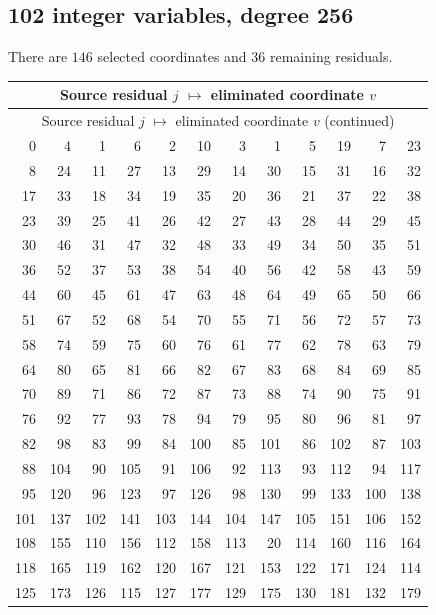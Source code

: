 \documentclass[11pt,letterpaper]{article}
\theoremstyle{definition}
\theoremstyle{remark}
\begin{document}
\subsection{102 integer variables, degree 256}
There are $146$ selected coordinates and $36$ remaining residuals.
\begingroup
\small
\setlength{\tabcolsep}{4pt}
\begin{longtable}{*{6}{r@{\,$\mapsto$\,}r}}
\hline
\multicolumn{12}{c}{Source residual $j$ $\mapsto$ eliminated coordinate $v$}\\
\hline
\endfirsthead
\hline
\multicolumn{12}{c}{Source residual $j$ $\mapsto$ eliminated coordinate $v$ (continued)}\\
\hline
\endhead
0 & 4 & 1 & 6 & 2 & 10 & 3 & 1 & 5 & 19 & 7 & 23 \\
8 & 24 & 11 & 27 & 13 & 29 & 14 & 30 & 15 & 31 & 16 & 32 \\
17 & 33 & 18 & 34 & 19 & 35 & 20 & 36 & 21 & 37 & 22 & 38 \\
23 & 39 & 25 & 41 & 26 & 42 & 27 & 43 & 28 & 44 & 29 & 45 \\
30 & 46 & 31 & 47 & 32 & 48 & 33 & 49 & 34 & 50 & 35 & 51 \\
36 & 52 & 37 & 53 & 38 & 54 & 40 & 56 & 42 & 58 & 43 & 59 \\
44 & 60 & 45 & 61 & 47 & 63 & 48 & 64 & 49 & 65 & 50 & 66 \\
51 & 67 & 52 & 68 & 54 & 70 & 55 & 71 & 56 & 72 & 57 & 73 \\
58 & 74 & 59 & 75 & 60 & 76 & 61 & 77 & 62 & 78 & 63 & 79 \\
64 & 80 & 65 & 81 & 66 & 82 & 67 & 83 & 68 & 84 & 69 & 85 \\
70 & 89 & 71 & 86 & 72 & 87 & 73 & 88 & 74 & 90 & 75 & 91 \\
76 & 92 & 77 & 93 & 78 & 94 & 79 & 95 & 80 & 96 & 81 & 97 \\
82 & 98 & 83 & 99 & 84 & 100 & 85 & 101 & 86 & 102 & 87 & 103 \\
88 & 104 & 90 & 105 & 91 & 106 & 92 & 113 & 93 & 112 & 94 & 117 \\
95 & 120 & 96 & 123 & 97 & 126 & 98 & 130 & 99 & 133 & 100 & 138 \\
101 & 137 & 102 & 141 & 103 & 144 & 104 & 147 & 105 & 151 & 106 & 152 \\
108 & 155 & 110 & 156 & 112 & 158 & 113 & 20 & 114 & 160 & 116 & 164 \\
118 & 165 & 119 & 162 & 120 & 167 & 121 & 153 & 122 & 171 & 124 & 114 \\
125 & 173 & 126 & 115 & 127 & 177 & 129 & 175 & 130 & 181 & 132 & 179 \\

\end{longtable}
\end{document}
